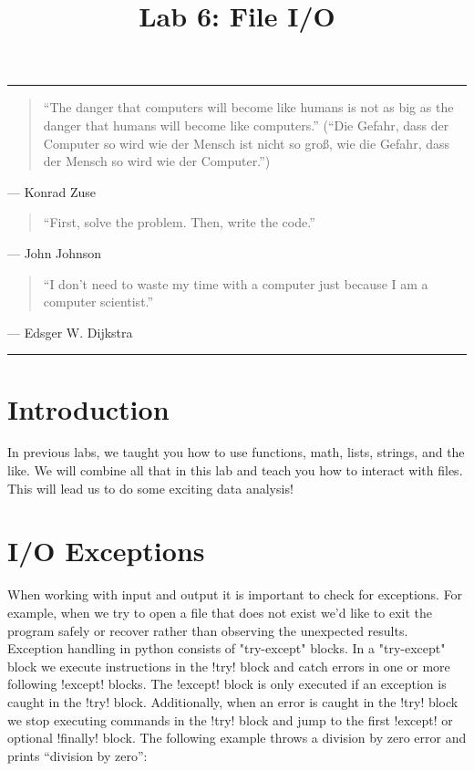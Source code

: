 \documentclass[11pt]{cselabheader}
\title{Lab 6: File I/O}
\begin{document}
\maketitle

\hrule
\begin{quotation}
``The danger that computers will become like humans is not as big as the danger
that humans will become like computers.'' (``Die Gefahr, dass der Computer so
wird wie der Mensch ist nicht so gro\ss, wie die Gefahr, dass der Mensch so wird
wie der Computer.'')
\end{quotation}
\begin{flushright}
--- Konrad Zuse
\end{flushright}

\begin{quotation}
	``First, solve the problem. Then, write the code.''
\end{quotation}
\begin{flushright}
	--- John Johnson
\end{flushright}

\begin{quotation}
``I don’t need to waste my time with a computer just because I am a computer
scientist.''
\end{quotation}
\begin{flushright}
--- Edsger W. Dijkstra
\end{flushright}

\hrule

\section{Introduction}
In previous labs, we taught you how to use functions, math, lists, strings, and
the like. We will combine all that in this lab and teach you how to interact
with files. This will lead us to do some exciting data analysis!

\section{I/O Exceptions}
When working with input and output it is important to check for exceptions.  For example, when we try to open a file that does not exist we'd like to exit the program safely or recover rather than observing the unexpected results.  Exception handling in python consists of "try-except" blocks.  In a "try-except" block we execute instructions in the \pythoninline!try! block and catch errors in one or more following \pythoninline!except! blocks.  The \pythoninline!except! block is only executed if an exception is caught in the \pythoninline!try! block.  Additionally, when an error is caught in the \pythoninline!try! block we stop executing commands in the \pythoninline!try! block and jump to the first \pythoninline!except! or optional \pythoninline!finally! block.  The following example throws a division by zero error and prints ``division by zero'':
\end{document}
